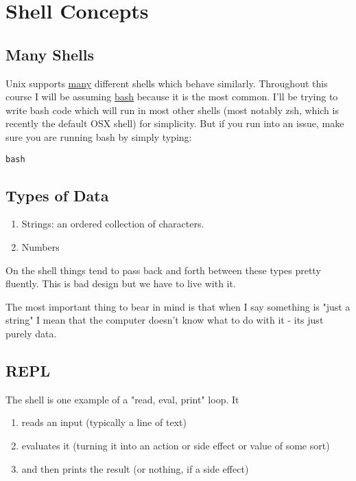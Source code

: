 \documentclass[11pt]{article}
\begin{document}
\section{Shell Concepts}
\label{sec:orgc03559a}

\subsection{Many Shells}
\label{sec:orgcab7262}

Unix supports \uline{many} different shells which behave
similarly. Throughout this course I will be assuming \href{https://en.wikipedia.org/wiki/Bash\_(Unix\_shell)}{bash} because it
is the most common. I'll be trying to write bash code which will run
in most other shells (most notably zsh, which is recently the default
OSX shell) for simplicity. But if you run into an issue, make sure you
are running bash by simply typing:

\begin{verbatim}
bash
\end{verbatim}

\subsection{Types of Data}
\label{sec:orgf15cb6b}

\begin{enumerate}
\item Strings: an ordered collection of characters.
\item Numbers
\end{enumerate}

On the shell things tend to pass back and forth between these types
pretty fluently. This is bad design but we have to live with it.

The most important thing to bear in mind is that when I say something
is "just a string" I mean that the computer doesn't know what to do
with it - its just purely data.

\subsection{REPL}
\label{sec:org1908a77}

The shell is one example of a "read, eval, print" loop. It 

\begin{enumerate}
\item reads an input (typically a line of text)
\item evaluates it (turning it into an action or side effect or value of
some sort)
\item and then prints the result (or nothing, if a side effect)
\end{enumerate}
\end{document}
